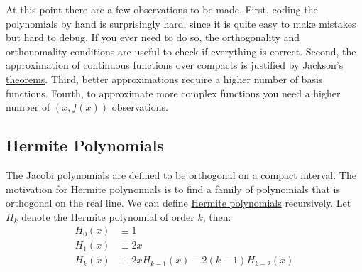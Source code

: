 \documentclass[12pt, a4paper]{article}
\begin{document}
At this point there are a few observations to be made.
First, coding the polynomials by hand is surprisingly hard, since it is quite easy to make mistakes but hard to debug.
If you ever need to do so, the orthogonality and orthonomality conditions are useful to check if everything is correct.
Second, the approximation of continuous functions over compacts is justified by \href{https://en.wikipedia.org/wiki/Jackson\%27s\_inequality}{Jackson's theorems}.
Third, better approximations require a higher number of basis functions.
Fourth, to approximate more complex functions you need a higher number of \((x, f(x))\) observations.
\subsection{Hermite Polynomials}
\label{sec:org086448e}
The Jacobi polynomials are defined to be orthogonal on a compact interval.
The motivation for Hermite polynomials is to find a family of polynomials that is orthogonal on the real line.
We can define \href{https://en.wikipedia.org/wiki/Hermite\_polynomials}{Hermite polynomials} recursively.
Let \(H_k\) denote the Hermite polynomial of order \(k\), then:
\begin{align*}
H_0(x)&\equiv 1\\
H_1(x)&\equiv 2x\\
H_k(x)&\equiv 2xH_{k-1}(x)-2(k-1)H_{k-2}(x)
\end{align*}
\end{document}
